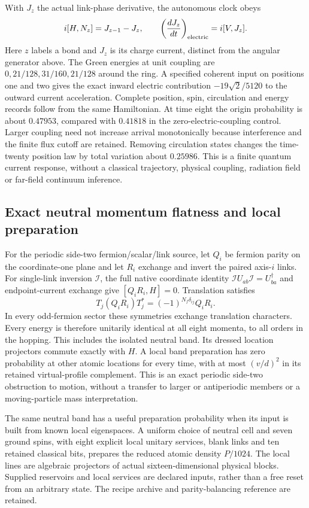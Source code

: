 With $J_z$ the actual link-phase derivative, the autonomous clock obeys
\[
 i[H,N_z]=J_{z-1}-J_z,\qquad
 \left(\frac{dJ_z}{dt}\right)_{\rm electric}=i[V,J_z].
\]
Here $z$ labels a bond and $J_z$ is its charge current, distinct from the
angular generator above. The Green energies at unit coupling are
$0,21/128,31/160,21/128$ around the ring. A specified coherent input on
positions one and two gives the exact inward electric contribution
$-19\sqrt2/5120$ to the outward current acceleration. Complete
position, spin, circulation and energy records follow from the same
Hamiltonian. At time eight the origin probability is about $0.47953$,
compared with $0.41818$ in the zero-electric-coupling control. Larger
coupling need not increase arrival monotonically because interference
and the finite flux cutoff are retained. Removing circulation states
changes the time-twenty position law by total variation about $0.25986$.
This is a finite quantum current response, without a classical trajectory,
physical coupling, radiation field or far-field continuum inference.

\subsection{Exact neutral momentum flatness and local preparation}
\label{sec:exact-neutral-flatness}

For the periodic side-two fermion/scalar/link source, let $Q_i$ be
fermion parity on the coordinate-one plane and let $R_i$ exchange and
invert the paired axis-$i$ links. For single-link inversion $\mathcal I$,
the full native coordinate identity
$\mathcal I U_{ab}\mathcal I=U_{ba}^\dagger$ and endpoint-current exchange
give $[Q_iR_i,H]=0$. Translation satisfies
\[
 T_j(Q_iR_i)T_j^*=(-1)^{N_f\delta_{ij}}Q_iR_i.
\]
In every odd-fermion sector these symmetries exchange translation
characters. Every energy is therefore unitarily identical at all eight
momenta, to all orders in the hopping. This includes the isolated neutral
band. Its dressed location projectors commute exactly with $H$. A local
band preparation has zero probability at other atomic locations for
every time, with at most $(v/d)^2$ in its retained virtual-profile
complement. This is an exact periodic side-two obstruction to motion,
without a transfer to larger or antiperiodic members or a moving-particle
mass interpretation.

The same neutral band has a useful preparation probability when its
input is built from known local eigenspaces. A uniform choice of neutral
cell and seven ground spins, with eight explicit local unitary services,
blank links and ten retained classical bits, prepares the reduced atomic
density $P/1024$. The local lines are algebraic projectors of actual
sixteen-dimensional physical blocks. Supplied reservoirs and local
services are declared inputs, rather than a free reset from an arbitrary
state. The recipe archive and parity-balancing reference are retained.

